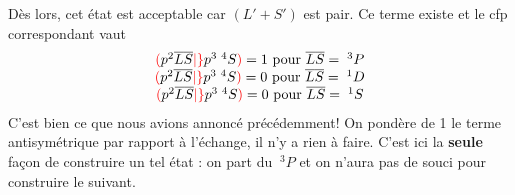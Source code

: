 Dès lors, cet état est acceptable car $(L'+S')$ est pair. Ce terme existe et le cfp correspondant
vaut
\begin{equation}
\begin{array}{c}
  {\color{red}( } p^{2}  \overline{L} \overline{S} 
{\color{red} \vert \} }
 p^3 \; ^4S {\color{red} )} = 1 ~\mbox{pour}~
\overline{L} \overline{S}  = \; ^3P\\
  {\color{red}( } p^{2}  \overline{L} \overline{S} 
{\color{red} \vert \} }
 p^3 \; ^4S {\color{red} )} = 0 ~\mbox{pour}~
\overline{L} \overline{S}  = \; ^1D\\
  {\color{red}( } p^{2}  \overline{L} \overline{S} 
{\color{red} \vert \} }
 p^3 \; ^4S {\color{red} )} = 0 ~\mbox{pour}~
\overline{L} \overline{S}  = \; ^1S
\end{array}
\end{equation}
C'est bien ce que nous avions annoncé précédemment! On pondère de 1 le terme antisymétrique
par rapport à l'échange, il n'y a rien à faire. C'est ici la \textbf{seule} façon de construire
un tel état : on part du $\ ^3P$ et on n'aura pas de souci pour construire le suivant. 


